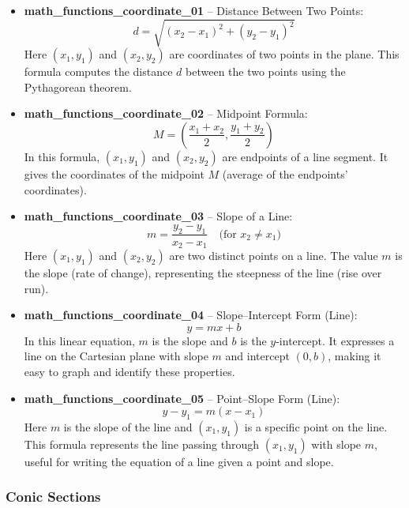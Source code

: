 \documentclass[11pt,a4paper]{article}
\begin{document}
\begin{itemize}
\item \textbf{math\_functions\_coordinate\_01} -- Distance Between Two Points: 
\[d = \sqrt{(x_2 - x_1)^2 + (y_2 - y_1)^2}\]
Here $(x_1, y_1)$ and $(x_2, y_2)$ are coordinates of two points in the plane. This formula computes the distance $d$ between the two points using the Pythagorean theorem.

\item \textbf{math\_functions\_coordinate\_02} -- Midpoint Formula: 
\[M = \left(\frac{x_1 + x_2}{2}, \frac{y_1 + y_2}{2}\right)\]
In this formula, $(x_1, y_1)$ and $(x_2, y_2)$ are endpoints of a line segment. It gives the coordinates of the midpoint $M$ (average of the endpoints' coordinates).

\item \textbf{math\_functions\_coordinate\_03} -- Slope of a Line: 
\[m = \frac{y_2 - y_1}{x_2 - x_1} \quad \text{(for } x_2 \neq x_1\text{)}\]
Here $(x_1, y_1)$ and $(x_2, y_2)$ are two distinct points on a line. The value $m$ is the slope (rate of change), representing the steepness of the line (rise over run).

\item \textbf{math\_functions\_coordinate\_04} -- Slope--Intercept Form (Line): 
\[y = mx + b\]
In this linear equation, $m$ is the slope and $b$ is the $y$-intercept. It expresses a line on the Cartesian plane with slope $m$ and intercept $(0,b)$, making it easy to graph and identify these properties.

\item \textbf{math\_functions\_coordinate\_05} -- Point--Slope Form (Line): 
\[y - y_1 = m(x - x_1)\]
Here $m$ is the slope of the line and $(x_1, y_1)$ is a specific point on the line. This formula represents the line passing through $(x_1, y_1)$ with slope $m$, useful for writing the equation of a line given a point and slope.
\end{itemize}

\subsubsection{Conic Sections}
\end{document}
